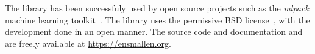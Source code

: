 \documentclass[twoside,11pt]{article}
\begin{document}


The library has been successfuly used by open source projects
such as the {\it mlpack} machine learning toolkit~\citep{mlpack2018}.
The library uses the permissive BSD license~\citep{Laurent_2008},
with the development done in an open manner.
The source code and documentation and are freely available at \mbox{\url{https://ensmallen.org}}.




\end{document}
